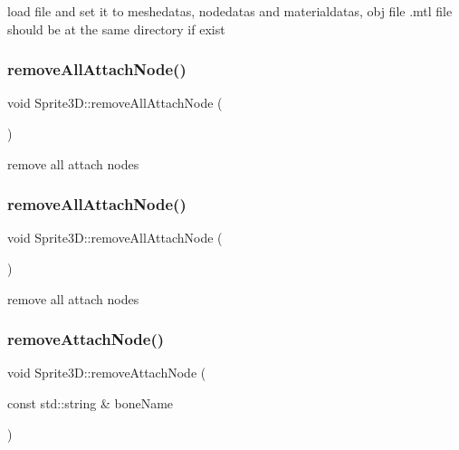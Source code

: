 load file and set it to meshedatas, nodedatas and materialdatas, obj file .mtl file should be at the same directory if exist \mbox{\label{classSprite3D_a65c7b8151da52aa226c6fd89942da971}} 
\subsubsection{\texorpdfstring{remove\+All\+Attach\+Node()}{removeAllAttachNode()}\hspace{0.1cm}{\footnotesize\ttfamily [1/2]}}
{\footnotesize\ttfamily void Sprite3\+D\+::remove\+All\+Attach\+Node (\begin{DoxyParamCaption}{ }\end{DoxyParamCaption})}

remove all attach nodes \mbox{\label{classSprite3D_a65c7b8151da52aa226c6fd89942da971}} 
\subsubsection{\texorpdfstring{remove\+All\+Attach\+Node()}{removeAllAttachNode()}\hspace{0.1cm}{\footnotesize\ttfamily [2/2]}}
{\footnotesize\ttfamily void Sprite3\+D\+::remove\+All\+Attach\+Node (\begin{DoxyParamCaption}{ }\end{DoxyParamCaption})}

remove all attach nodes \mbox{\label{classSprite3D_a39e52d6b3fc8cf7e8fe5dfb047880308}} 
\subsubsection{\texorpdfstring{remove\+Attach\+Node()}{removeAttachNode()}\hspace{0.1cm}{\footnotesize\ttfamily [1/2]}}
{\footnotesize\ttfamily void Sprite3\+D\+::remove\+Attach\+Node (\begin{DoxyParamCaption}\item[{const std\+::string \&}]{bone\+Name }\end{DoxyParamCaption})}

